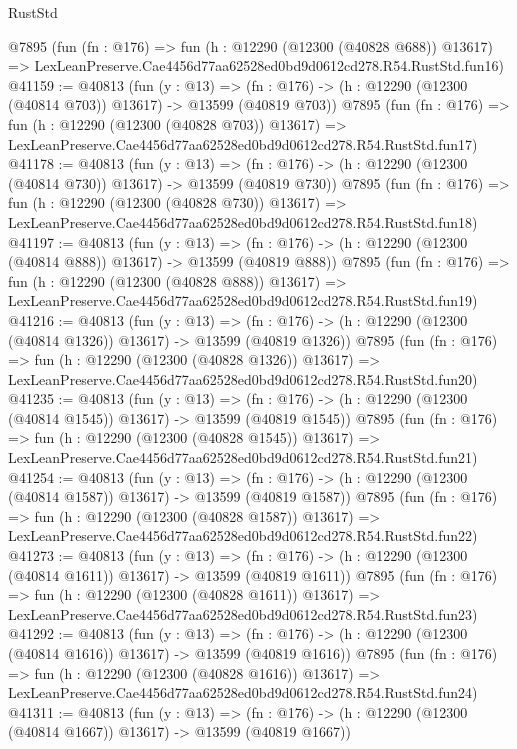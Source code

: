 \begin{lexlean}{RustStd}
\begin{coremodule}
    @7895
    (fun (fn : @176) =>
    fun (h : @12290 (@12300 (@40828 @688)) @13617) =>
    LexLeanPreserve.Cae4456d77aa62528ed0bd9d0612cd278.R54.RustStd.fun16)
@41159 := @40813
    (fun (y : @13) =>
    (fn : @176) -> (h : @12290 (@12300 (@40814 @703)) @13617) -> @13599 (@40819 @703))
    @7895
    (fun (fn : @176) =>
    fun (h : @12290 (@12300 (@40828 @703)) @13617) =>
    LexLeanPreserve.Cae4456d77aa62528ed0bd9d0612cd278.R54.RustStd.fun17)
@41178 := @40813
    (fun (y : @13) =>
    (fn : @176) -> (h : @12290 (@12300 (@40814 @730)) @13617) -> @13599 (@40819 @730))
    @7895
    (fun (fn : @176) =>
    fun (h : @12290 (@12300 (@40828 @730)) @13617) =>
    LexLeanPreserve.Cae4456d77aa62528ed0bd9d0612cd278.R54.RustStd.fun18)
@41197 := @40813
    (fun (y : @13) =>
    (fn : @176) -> (h : @12290 (@12300 (@40814 @888)) @13617) -> @13599 (@40819 @888))
    @7895
    (fun (fn : @176) =>
    fun (h : @12290 (@12300 (@40828 @888)) @13617) =>
    LexLeanPreserve.Cae4456d77aa62528ed0bd9d0612cd278.R54.RustStd.fun19)
@41216 := @40813
    (fun (y : @13) =>
    (fn : @176) -> (h : @12290 (@12300 (@40814 @1326)) @13617) -> @13599 (@40819 @1326))
    @7895
    (fun (fn : @176) =>
    fun (h : @12290 (@12300 (@40828 @1326)) @13617) =>
    LexLeanPreserve.Cae4456d77aa62528ed0bd9d0612cd278.R54.RustStd.fun20)
@41235 := @40813
    (fun (y : @13) =>
    (fn : @176) -> (h : @12290 (@12300 (@40814 @1545)) @13617) -> @13599 (@40819 @1545))
    @7895
    (fun (fn : @176) =>
    fun (h : @12290 (@12300 (@40828 @1545)) @13617) =>
    LexLeanPreserve.Cae4456d77aa62528ed0bd9d0612cd278.R54.RustStd.fun21)
@41254 := @40813
    (fun (y : @13) =>
    (fn : @176) -> (h : @12290 (@12300 (@40814 @1587)) @13617) -> @13599 (@40819 @1587))
    @7895
    (fun (fn : @176) =>
    fun (h : @12290 (@12300 (@40828 @1587)) @13617) =>
    LexLeanPreserve.Cae4456d77aa62528ed0bd9d0612cd278.R54.RustStd.fun22)
@41273 := @40813
    (fun (y : @13) =>
    (fn : @176) -> (h : @12290 (@12300 (@40814 @1611)) @13617) -> @13599 (@40819 @1611))
    @7895
    (fun (fn : @176) =>
    fun (h : @12290 (@12300 (@40828 @1611)) @13617) =>
    LexLeanPreserve.Cae4456d77aa62528ed0bd9d0612cd278.R54.RustStd.fun23)
@41292 := @40813
    (fun (y : @13) =>
    (fn : @176) -> (h : @12290 (@12300 (@40814 @1616)) @13617) -> @13599 (@40819 @1616))
    @7895
    (fun (fn : @176) =>
    fun (h : @12290 (@12300 (@40828 @1616)) @13617) =>
    LexLeanPreserve.Cae4456d77aa62528ed0bd9d0612cd278.R54.RustStd.fun24)
@41311 := @40813
    (fun (y : @13) =>
    (fn : @176) -> (h : @12290 (@12300 (@40814 @1667)) @13617) -> @13599 (@40819 @1667))

\end{coremodule}
\end{lexlean}
